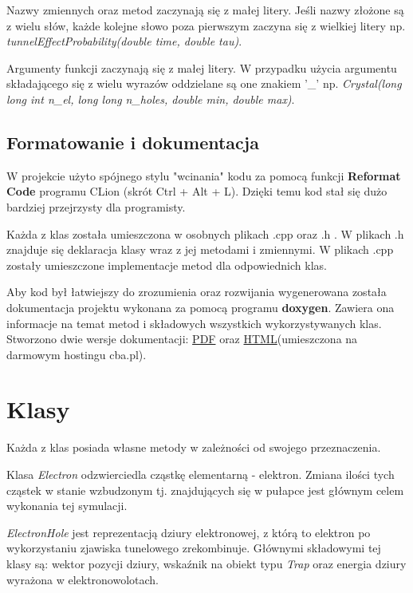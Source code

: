 Nazwy zmiennych oraz metod zaczynają się z małej litery. Jeśli nazwy złożone są z wielu słów, każde kolejne słowo poza pierwszym zaczyna się z wielkiej litery np. \textit{tunnelEffectProbability(double time, double tau)}. 

Argumenty funkcji zaczynają się z małej litery. W przypadku użycia argumentu składającego się z wielu wyrazów oddzielane są one znakiem '\_'  np. \textit{Crystal(long long int n\_el, long long n\_holes, double min, double max)}.

\subsection{Formatowanie i dokumentacja}

W projekcie użyto spójnego stylu "wcinania" kodu za pomocą funkcji \textbf{Reformat Code} programu CLion (skrót Ctrl + Alt + L). Dzięki temu kod stał się dużo bardziej przejrzysty dla programisty.

Każda z klas została umieszczona w osobnych plikach .cpp oraz .h . W plikach .h znajduje się deklaracja klasy wraz z jej metodami i zmiennymi. W plikach .cpp zostały umieszczone implementacje metod dla odpowiednich klas. 

Aby kod był łatwiejszy do zrozumienia oraz rozwijania wygenerowana została dokumentacja projektu wykonana za pomocą programu \textbf{doxygen}. Zawiera ona informacje na temat metod i składowych wszystkich wykorzystywanych klas. Stworzono dwie wersje dokumentacji: \href{https://github.com/Sharkuu/Dissertation/blob/master/Dokumentacja\%20pdf/Dokumentacja.pdf}{PDF} oraz \href{http://dokumentacja.c0.pl/}{HTML}(umieszczona na darmowym hostingu cba.pl).

\section{Klasy}
Każda z klas posiada własne metody w zależności od swojego przeznaczenia.

Klasa \textit{Electron} odzwierciedla cząstkę elementarną - elektron. Zmiana ilości tych cząstek w stanie wzbudzonym tj. znajdujących się w pułapce jest głównym celem wykonania tej symulacji.

\textit{ElectronHole} jest reprezentacją dziury elektronowej, z którą to elektron po wykorzystaniu zjawiska tunelowego zrekombinuje. Głównymi składowymi tej klasy są: wektor pozycji dziury, wskaźnik na obiekt typu \textit{Trap} oraz energia dziury wyrażona w elektronowolotach. 

